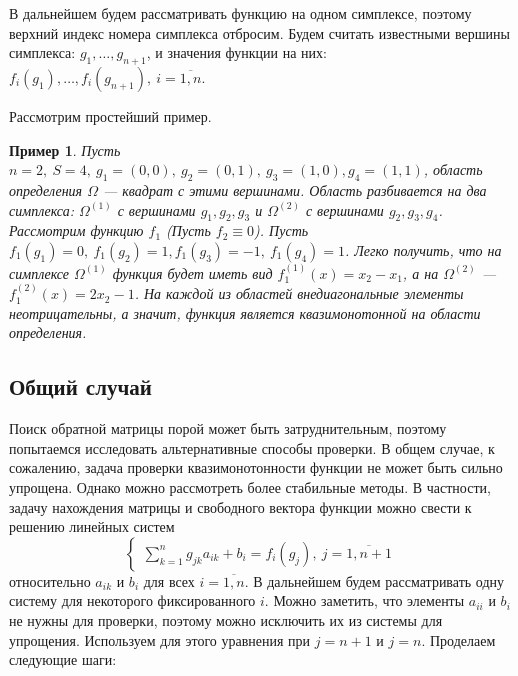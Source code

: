 \documentclass{article}
\newtheorem{example}{Пример}
\theoremstyle{definition}
\begin{document}
В дальнейшем будем рассматривать функцию на одном симплексе, поэтому верхний индекс номера симплекса отбросим. Будем считать известными вершины симплекса: \(g_1,\dots, g_{n+1}\), и значения функции на них: \(f_i(g_1),\dots,f_i(g_{n+1}),\ i = \overline{1, n}\).

Рассмотрим простейший пример.
\begin{example}
	Пусть \(n = 2,\ S = 4,\ g_1 = (0, 0),\ g_2 = (0, 1),\ g_3 = (1, 0), g_4 = (1, 1)\), область определения \(\Omega\) --- квадрат с этими вершинами. Область разбивается на два симплекса:
	\(\Omega^{(1)}\) с вершинами \(g_1, g_2, g_3\) и \(\Omega^{(2)}\) с вершинами \(g_2, g_3, g_4\). Рассмотрим функцию \(f_1\) (Пусть \(f_2 \equiv 0\)). Пусть \(f_1(g_1) = 0,\ f_1(g_2) = 1, f_1(g_3) = -1,\ f_1(g_4) = 1\). Легко получить, что на симплексе \(\Omega^{(1)}\) функция будет иметь вид \(f_1^{(1)}(x) = x_2 - x_1\), а на \(\Omega^{(2)}\) --- \(f_1^{(2)}(x) = 2 x_2 - 1\). На каждой из областей внедиагональные элементы неотрицательны, а значит, функция является квазимонотонной на области определения.
\end{example}

\subsection{Общий случай}
Поиск обратной матрицы порой может быть затруднительным, поэтому попытаемся исследовать альтернативные способы проверки. В общем случае, к сожалению, задача проверки квазимонотонности функции не может быть сильно упрощена. Однако можно рассмотреть более стабильные методы. В частности, задачу нахождения матрицы и свободного вектора функции можно свести к решению линейных систем
\[
\begin{cases}
	\sum_{k = 1}^{n}g_{jk}a_{ik} + b_i = f_i(g_j),\ j = \overline{1, n+1}
\end{cases}
\]
относительно \(a_{ik}\) и \(b_i\) для всех \(i = \overline{1, n}\). В дальнейшем будем рассматривать одну систему для некоторого фиксированного \(i\). Можно заметить, что элементы \(a_{ii}\) и \(b_i\) не нужны для проверки, поэтому можно исключить их из системы для упрощения. Используем для этого уравнения при \(j = n+1\) и \(j = n\). Проделаем следующие шаги:
\end{document}
